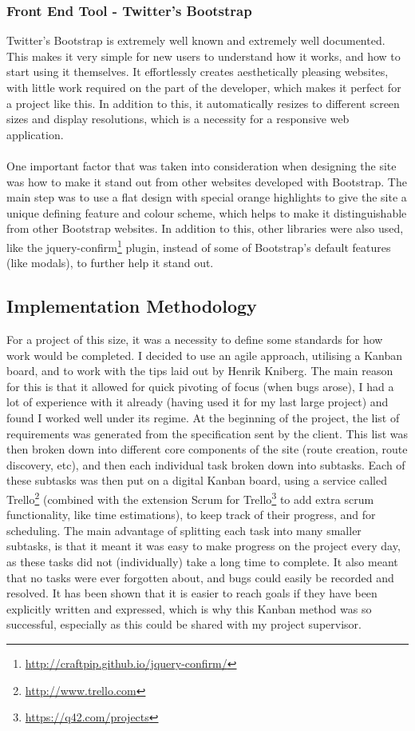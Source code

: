 \subsubsection{Front End Tool - Twitter's Bootstrap}
Twitter's Bootstrap is extremely well known and extremely well documented. This makes it very simple for new users to understand how it works, and how to start using it themselves. It effortlessly creates aesthetically pleasing websites, with little work required on the part of the developer, which makes it perfect for a project like this. In addition to this, it automatically resizes to different screen sizes and display resolutions, which is a necessity for a responsive web application.\ \\
\ \\
One important factor that was taken into consideration when designing the site was how to make it stand out from other websites developed with Bootstrap. The main step was to use a flat design with special orange highlights to give the site a unique defining feature and colour scheme, which helps to make it distinguishable from other Bootstrap websites. In addition to this, other libraries were also used, like the jquery-confirm\footnote{\url{http://craftpip.github.io/jquery-confirm/}} plugin, instead of some of Bootstrap's default features (like modals), to further help it stand out.

\newpage 
\subsection{Implementation Methodology}
For a project of this size, it was a necessity to define some standards for how work would be completed. I decided to use an agile approach, utilising a Kanban board, and to work with the tips laid out by Henrik Kniberg\cite{kniberg2007scrum}. The main reason for this is that it allowed for quick pivoting of focus (when bugs arose), I had a lot of experience with it already (having used it for my last large project) and found I worked well under its regime. At the beginning of the project, the list of requirements was generated from the specification sent by the client. This list was then broken down into different core components of the site (route creation, route discovery, etc), and then each individual task broken down into subtasks. Each of these subtasks was then put on a digital Kanban board, using a service called Trello\footnote{\url{http://www.trello.com}} (combined with the extension Scrum for Trello\footnote{\url{https://q42.com/projects}} to add extra scrum functionality, like time estimations), to keep track of their progress, and for scheduling. The main advantage of splitting each task into many smaller subtasks, is that it meant it was easy to make progress on the project every day, as these tasks did not (individually) take a long time to complete. It also meant that no tasks were ever forgotten about, and bugs could easily be recorded and resolved. It has been shown that it is easier to reach goals if they have been explicitly written and expressed\cite{wilson2008goal}, which is why this Kanban method was so successful, especially as this could be shared with my project supervisor.

